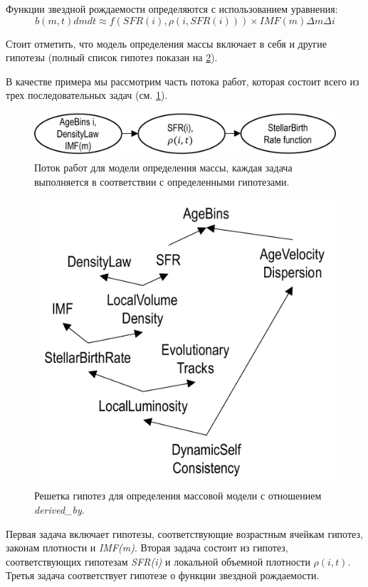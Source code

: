 Функции звездной рождаемости определяются с использованием уравнения:
\begin{equation}
b(m, t)dm dt \approx f\left(SFR\left(i\right), \rho\left(i, SFR\left(i\right)\right)\right) 
\times IMF(m)\Delta m \Delta i
\end{equation}

Стоит отметить, что модель определения массы включает в себя и другие гипотезы 
(полный список гипотез показан на \cref{fig:BGM_lattice}).

В качестве примера мы рассмотрим часть потока работ, которая состоит всего из 
трех последовательных задач (см. \cref{fig:BGM_workflow}). 


\begin{figure}[h!]
    \centering
    \includegraphics[width=0.7\linewidth]{images/BGM_workflow.pdf}
    \caption{Поток работ для модели определения массы, каждая задача выполняется 
            в соответствии с определенными гипотезами.}\label{fig:BGM_workflow}
\end{figure}

\begin{figure}[ht]
    \centering
    \includegraphics[width=0.6\linewidth]{images/BGM_lattice.pdf}
    \caption{Решетка гипотез  для определения массовой модели с отношением \textit{derived\_by}.}\label{fig:BGM_lattice}
\end{figure}

Первая задача включает гипотезы, соответствующие возрастным ячейкам гипотез, законам плотности и \textit{IMF(m)}. 
Вторая задача состоит из гипотез, соответствующих гипотезам \textit{SFR(i)} и локальной объемной плотности 
$\rho(i, t)$. Третья задача соответствует гипотезе о функции звездной рождаемости.

